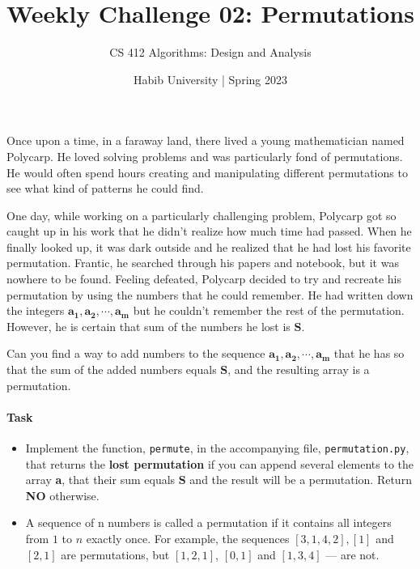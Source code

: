 \documentclass[a4paper]{exam}
\title{Weekly Challenge 02: Permutations}
\author{CS 412 Algorithms: Design and Analysis}
\date{Habib University | Spring 2023}
\begin{document}
\maketitle

\begin{questions}

    Once upon a time, in a faraway land, there lived a young mathematician named Polycarp.
    He loved solving problems and was particularly fond of permutations. He would often
    spend hours creating and manipulating different permutations to see what kind of
    patterns he could find.

    One day, while working on a particularly challenging problem, Polycarp got so caught up
    in his work that he didn't realize how much time had passed. When he finally looked up,
    it was dark outside and he realized that he had lost his favorite permutation. Frantic,
    he searched through his papers and notebook, but it was nowhere to be found. Feeling
    defeated, Polycarp decided to try and recreate his permutation by using the numbers
    that he could remember. He had written down the integers $\mathbf{a_1, a_2, \cdots , a_m}$
    but he couldn't remember the rest of the permutation.  However, he is certain that
    sum of the numbers he lost is $\mathbf{S}$.

    Can you find a way to add numbers to the sequence $\mathbf{a_1,a_2,\cdots, a_m}$ that he has
    so that the sum of the added numbers equals $\mathbf{S}$, and the resulting array is a permutation.

    \paragraph{Task}
    \begin{itemize}
        \item Implement the function, \texttt{permute}, in the accompanying file,  \texttt{permutation.py},
              that returns the \textbf{lost permutation} if you can append several elements to the array \textbf{a},
              that their sum equals $\mathbf{S}$ and the result will be a permutation. Return \textbf{NO} otherwise.

        \item A sequence of n numbers is called a permutation if it contains all integers from $1$ to $n$
              exactly once. For example, the sequences $[3,1,4,2], [1]$  and $[2,1]$ are permutations, but $[1,2,1]$,
              $[0,1]$ and $[1,3,4]$ — are not.


\end{itemize}
\end{questions}
\end{document}
